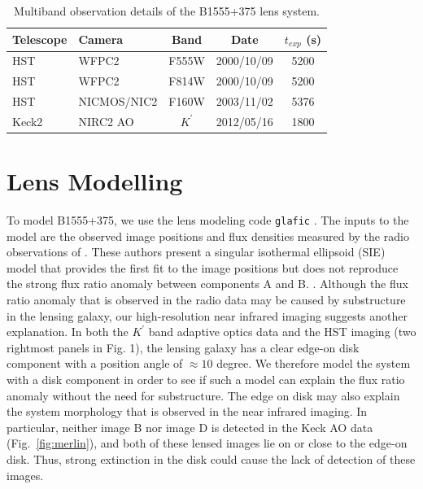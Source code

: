 \documentclass[useAMS,usenatbib]{mn2e}
\begin{document}
\begin{table}
 \centering
  \caption{Multiband observation details of the B1555+375 lens system.}
  \begin{tabular}{@{}llccc}
  
\hline
  Telescope     &      Camera     &  Band & Date &$t_{exp}$ (s) \\

 \hline
   HST				&		WFPC2    &  F555W		&	2000/10/09 	&	5200\\
   HST				&		WFPC2    &  F814W		&	2000/10/09 &	5200\\
   HST				&		NICMOS/NIC2	&	F160W	&	2003/11/02 & 5376\\
   Keck2			&		NIRC2 AO	&   $K^\prime$	& 2012/05/16	&  1800\\
   \hline
\end{tabular}
\end{table}


\section{Lens Modelling}

To model B1555+375, we use the lens modeling code {\tt glafic}
\citep{Oguri}.  The inputs to the model are the observed image
positions and flux densities measured by the radio observations of
\citet{Marlow}.  These authors present a singular isothermal ellipsoid
(SIE) model that provides the first fit to the image positions but
does not reproduce the strong flux ratio anomaly between components A
and B.  \citep[see Fig.~6 and Tables 2 \& 3 in][]{Marlow}.  Although
the flux ratio anomaly that is observed in the radio data may be
caused by substructure in the lensing galaxy, our high-resolution near
infrared imaging suggests another explanation.  In both the $K^\prime$
band adaptive optics data and the HST imaging (two rightmost panels in
Fig. 1), the lensing galaxy has a clear edge-on disk component with a
position angle of $\approx 10$ degree.  We therefore model the system
with a disk component in order to see if such a model can explain the
flux ratio anomaly without the need for substructure.  The edge on
disk may also explain the system morphology that is observed in the
near infrared imaging.  In particular, neither image B nor image D is
detected in the Keck AO data (Fig.~\ref{fig:merlin}), and both of
these lensed images lie on or close to the edge-on disk.  Thus, strong
extinction in the disk could cause the lack of detection of these
images.
\end{document}
